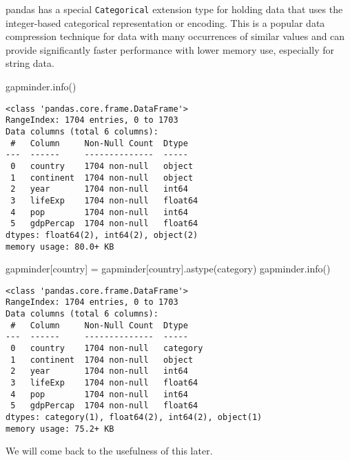 \documentclass[
  letterpaper,
  DIV=11,
  numbers=noendperiod]{scrreprt}
\newenvironment{Shaded}{\begin{snugshade}}{\end{snugshade}}
\newcommand{\NormalTok}[1]{\textcolor[rgb]{0.00,0.23,0.31}{#1}}
\newcommand{\OperatorTok}[1]{\textcolor[rgb]{0.37,0.37,0.37}{#1}}
\newcommand{\StringTok}[1]{\textcolor[rgb]{0.13,0.47,0.30}{#1}}
\begin{document}
pandas has a special \texttt{Categorical} extension type for holding
data that uses the integer-based categorical representation or encoding.
This is a popular data compression technique for data with many
occurrences of similar values and can provide significantly faster
performance with lower memory use, especially for string data.

\begin{Shaded}
\begin{Highlighting}[]
\NormalTok{gapminder.info()}
\end{Highlighting}
\end{Shaded}

\begin{verbatim}
<class 'pandas.core.frame.DataFrame'>
RangeIndex: 1704 entries, 0 to 1703
Data columns (total 6 columns):
 #   Column     Non-Null Count  Dtype  
---  ------     --------------  -----  
 0   country    1704 non-null   object 
 1   continent  1704 non-null   object 
 2   year       1704 non-null   int64  
 3   lifeExp    1704 non-null   float64
 4   pop        1704 non-null   int64  
 5   gdpPercap  1704 non-null   float64
dtypes: float64(2), int64(2), object(2)
memory usage: 80.0+ KB
\end{verbatim}

\begin{Shaded}
\begin{Highlighting}[]
\NormalTok{gapminder[}\StringTok{\textquotesingle{}country\textquotesingle{}}\NormalTok{] }\OperatorTok{=}\NormalTok{ gapminder[}\StringTok{\textquotesingle{}country\textquotesingle{}}\NormalTok{].astype(}\StringTok{\textquotesingle{}category\textquotesingle{}}\NormalTok{)}
\NormalTok{gapminder.info()}
\end{Highlighting}
\end{Shaded}

\begin{verbatim}
<class 'pandas.core.frame.DataFrame'>
RangeIndex: 1704 entries, 0 to 1703
Data columns (total 6 columns):
 #   Column     Non-Null Count  Dtype   
---  ------     --------------  -----   
 0   country    1704 non-null   category
 1   continent  1704 non-null   object  
 2   year       1704 non-null   int64   
 3   lifeExp    1704 non-null   float64 
 4   pop        1704 non-null   int64   
 5   gdpPercap  1704 non-null   float64 
dtypes: category(1), float64(2), int64(2), object(1)
memory usage: 75.2+ KB
\end{verbatim}

We will come back to the usefulness of this later.
\end{document}
